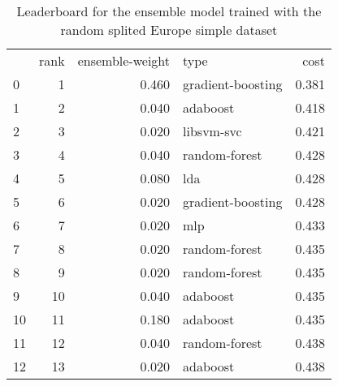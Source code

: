 \begin{table}[]
	\centering
	\begin{tabular}{lrrlr}
		   & rank & ensemble-weight & type              & cost  \\
		0  & 1    & 0.460           & gradient-boosting & 0.381 \\
		1  & 2    & 0.040           & adaboost          & 0.418 \\
		2  & 3    & 0.020           & libsvm-svc        & 0.421 \\
		3  & 4    & 0.040           & random-forest     & 0.428 \\
		4  & 5    & 0.080           & lda               & 0.428 \\
		5  & 6    & 0.020           & gradient-boosting & 0.428 \\
		6  & 7    & 0.020           & mlp               & 0.433 \\
		7  & 8    & 0.020           & random-forest     & 0.435 \\
		8  & 9    & 0.020           & random-forest     & 0.435 \\
		9  & 10   & 0.040           & adaboost          & 0.435 \\
		10 & 11   & 0.180           & adaboost          & 0.435 \\
		11 & 12   & 0.040           & random-forest     & 0.438 \\
		12 & 13   & 0.020           & adaboost          & 0.438 \\
	\end{tabular}

	\caption{Leaderboard for the ensemble model trained with the random splited Europe simple dataset}
	\label{tab:lb-europe-games-simple-randsplit}
\end{table}

